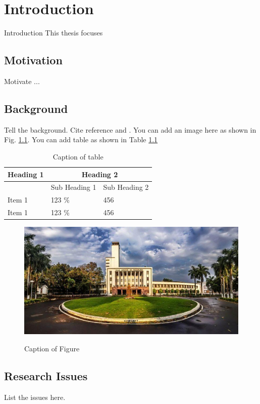 \chapter[Introduction]{Introduction}{Introduction}
\label{chap:intro}
{\Huge \calligra T}his thesis focuses 

\section{Motivation}
Motivate ...

\section{Background}
Tell the background. Cite reference \cite{samanta2020direct} and \cite{samanta2018fast}. You can add an image here as shown in Fig. \ref{figure:labelName}. You can add table as shown in Table \ref{Table:labelOfTable}

\begin{table}[h]
	\renewcommand{\arraystretch}{1.3}
	\caption{Caption of table} \label{Table:labelOfTable} \centering
	\begin{tabular}{l|l|l}
		\hline \hline
		Heading 1           & \multicolumn{2}{c}{Heading 2}   \\ \hline
		& Sub Heading 1 & Sub Heading 2     \\ \hline
		Item 1      & 123 \%       & 456 \\
		Item 1      & 123 \%       & 456 \\
		\hline
	\end{tabular}
\end{table}

\begin{figure}[h] 
	\centering
	{\includegraphics[width=120mm]{Chapter_intro/figs/img1}}
	\caption{Caption of Figure} \label{figure:labelName}
\end{figure}

\section{Research Issues}
List the issues here.

